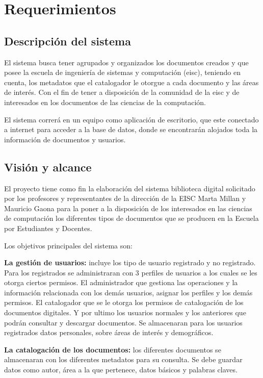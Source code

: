 \documentclass[]{article}
\begin{document}
\section{Requerimientos}
	\subsection{Descripción del sistema}
	El sistema busca tener agrupados y organizados los documentos creados y que posee la escuela de
	ingeniería de sistemas y computación (eisc), teniendo en cuenta, los metadatos que el catalogador
	le otorgue a cada documento y las áreas de interés. Con el fin de tener a disposición de la
	comunidad de la eisc y de interesados en los documentos de las ciencias de la computación. 
	
	El sistema correrá en un equipo como aplicación de escritorio, que este conectado a internet para
	acceder a la base de datos, donde se encontrarán alojados toda la información de documentos y
	usuarios.
	
	\subsection{Visión y alcance}
	El proyecto tiene como fin la elaboración del sistema biblioteca digital solicitado por los
	profesores y representantes de la dirección de la EISC Marta Millan y Mauricio Gaona para la
	poner a la disposición de los interesados en las ciencias de computación los diferentes tipos de
	documentos que se producen en la Escuela por Estudiantes y Docentes.
	
	Los objetivos principales del sistema son:
	
	\textbf{La gestión de usuarios:} incluye los tipo de usuario registrado y no registrado. Para los
	registrados se administraran con 3 perfiles de usuarios a los cuales se les otorga ciertos
	permisos. El administrador que gestiona las operaciones y la información relacionada con los
	demás usuarios, asignar los perfiles y los demás permisos. El catalogador que se le otorga los
	permisos de catalogación de los documentos digitales. Y por ultimo los usuarios normales y los
	anteriores que podrán consultar y descargar documentos. Se almacenaran para los usuarios
	registrados datos personales, sobre áreas de interés y demográficos.
	
	\textbf{La catalogación de los documentos:} los diferentes documentos se almacenaran con los
	diferentes metadatos para su consulta. Se debe guardar datos como autor, área a la que pertenece,
	datos básicos y palabras claves.
	
\end{document}
